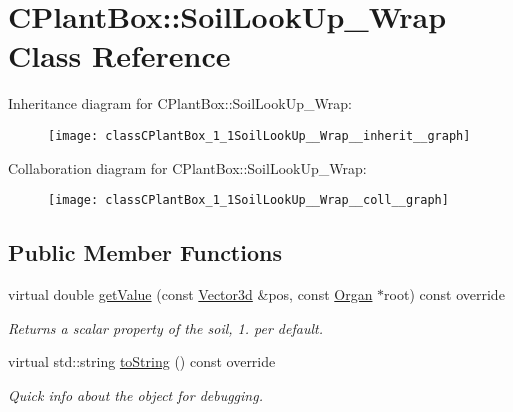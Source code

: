 \hypertarget{classCPlantBox_1_1SoilLookUp__Wrap}{}\section{C\+Plant\+Box\+:\+:Soil\+Look\+Up\+\_\+\+Wrap Class Reference}
\label{classCPlantBox_1_1SoilLookUp__Wrap}


Inheritance diagram for C\+Plant\+Box\+:\+:Soil\+Look\+Up\+\_\+\+Wrap\+:\nopagebreak
\begin{figure}[H]
\begin{center}
\leavevmode
\texttt{[image: classCPlantBox\_1\_1SoilLookUp\_\_Wrap\_\_inherit\_\_graph]}
\end{center}
\end{figure}


Collaboration diagram for C\+Plant\+Box\+:\+:Soil\+Look\+Up\+\_\+\+Wrap\+:\nopagebreak
\begin{figure}[H]
\begin{center}
\leavevmode
\texttt{[image: classCPlantBox\_1\_1SoilLookUp\_\_Wrap\_\_coll\_\_graph]}
\end{center}
\end{figure}
\subsection*{Public Member Functions}
\begin{DoxyCompactItemize}
\item 
virtual double \hyperlink{classCPlantBox_1_1SoilLookUp__Wrap_aa0d7d887b8dba944b504bb9c28cb87ac}{get\+Value} (const \hyperlink{classCPlantBox_1_1Vector3d}{Vector3d} \&pos, const \hyperlink{classCPlantBox_1_1Organ}{Organ} $\ast$root) const override
\begin{DoxyCompactList}\small\item\em Returns a scalar property of the soil, 1. per default. \end{DoxyCompactList}\item 
\mbox{\label{classCPlantBox_1_1SoilLookUp__Wrap_ada0041d2c1ca260a684570f806f180d5}} 
virtual std\+::string \hyperlink{classCPlantBox_1_1SoilLookUp__Wrap_ada0041d2c1ca260a684570f806f180d5}{to\+String} () const override
\begin{DoxyCompactList}\small\item\em Quick info about the object for debugging. \end{DoxyCompactList}\end{DoxyCompactItemize}


